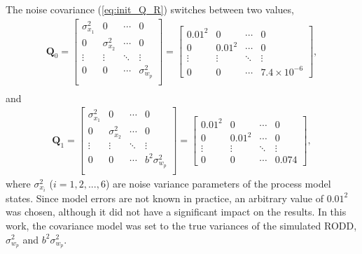 The noise covariance (\ref{eq:init_Q_R}) switches between two values,
\begin{equation} \label{eq:Q0}
	\begin{aligned}
		\mathbf{Q}_0=\begin{bmatrix}
			\sigma_{x_1}^2 & 0 & \cdots & 0 \\
			0 & \sigma_{x_2}^2 & \cdots & 0 \\
			\vdots & \vdots & \ddots & \vdots \\
			0 & 0 & \cdots & \sigma_{w_p}^2 \\
		\end{bmatrix}=\begin{bmatrix}
			0.01^2 & 0 & \cdots & 0 \\
			0 & 0.01^2 & \cdots & 0 \\
			\vdots & \vdots & \ddots & \vdots \\
			0 & 0 & \cdots & 7.4\times10^{-6}
		\end{bmatrix}, \\
	\end{aligned}
\end{equation}
and 
\begin{equation} \label{eq:Q1}
	\begin{aligned}
		\mathbf{Q}_1=\begin{bmatrix}
			\sigma_{x_1}^2 & 0 & \cdots & 0 \\
			0 & \sigma_{x_2}^2 & \cdots & 0 \\
			\vdots & \vdots & \ddots & \vdots \\
			0 & 0 & \cdots & b^2\sigma_{w_p}^2 \\
		\end{bmatrix}=\begin{bmatrix}
			0.01^2 & 0 & \cdots & 0 \\
			0 & 0.01^2 & \cdots & 0 \\
			\vdots & \vdots & \ddots & \vdots \\
			0 & 0 & \cdots & 0.074
		\end{bmatrix},
	\end{aligned}
\end{equation}
where $\sigma_{x_i}^2$ ($i=1,2,...,6$) are noise variance parameters of the process model states. Since model errors are not known in practice, an arbitrary value of  $0.01^2$ was chosen, although it did not have a significant impact on the results. In this work, the covariance model was set to the true variances of the simulated RODD, $\sigma_{w_p}^2$ and $b^2\sigma_{w_p}^2$.

